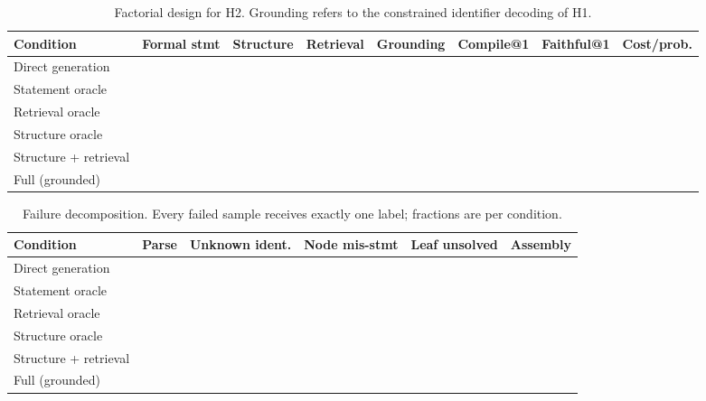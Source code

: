 \documentclass[sigconf,anonymous]{aamas}
\newcommand{\yes}{\ding{51}} %
\newcommand{\no}{\ding{55}}
\begin{document}
{\begin{table}[h]
    \centering
    \caption{Factorial design for H2. Grounding refers to the constrained
    identifier decoding of H1.}
    \label{tab:factorial}
    \small
    \begin{tabular}{l c c c c c c c}
        \toprule
        Condition & Formal stmt & Structure & Retrieval & Grounding &
          Compile@1 & Faithful@1 & Cost/prob. \\
        \midrule
        Direct generation      & \no  & \no  & \no  & \no  & & & \\
        Statement oracle       & \yes & \no  & \no  & \no  & & & \\
        Retrieval oracle       & \yes & \no  & \yes & \no  & & & \\
        Structure oracle       & \yes & \yes & \no  & \no  & & & \\
        Structure + retrieval  & \yes & \yes & \yes & \no  & & & \\
        Full (grounded)        & \yes & \yes & \yes & \yes & & & \\
        \bottomrule
    \end{tabular}
\end{table}

\begin{table}[h]
    \centering
    \caption{Failure decomposition. Every failed sample receives exactly one
    label; fractions are per condition.}
    \label{tab:failures}
    \small
    \begin{tabular}{l c c c c c}
        \toprule
        Condition & Parse & Unknown ident. & Node mis-stmt & Leaf unsolved &
          Assembly \\
        \midrule
        Direct generation      & & & & & \\
        Statement oracle       & & & & & \\
        Retrieval oracle       & & & & & \\
        Structure oracle       & & & & & \\
        Structure + retrieval  & & & & & \\
        Full (grounded)        & & & & & \\
        \bottomrule
    \end{tabular}
\end{table}


}
\end{document}
